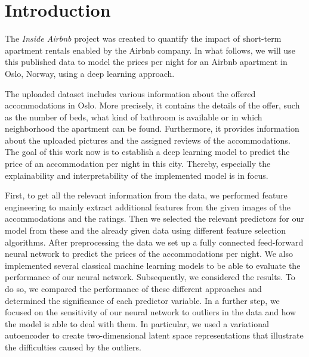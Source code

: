 \section{Introduction}


The \emph{Inside Airbnb} project was created to quantify the impact of short-term apartment rentals enabled by the Airbnb company.
In what follows, we will use this published data to model the prices per night for an Airbnb apartment in Oslo, Norway, using a deep learning approach. 

The uploaded dataset includes various information about the offered accommodations in Oslo. More precisely, it contains the details of the offer, such as the number of beds, what kind of bathroom is available or in which neighborhood the apartment can be found. Furthermore, it provides information about the uploaded pictures and the assigned reviews of the accommodations.
The goal of this work now is to establish a deep learning model to predict the price of an accommodation per night in this city. Thereby, especially the explainability and interpretability of the implemented model is in focus.

First, to get all the relevant information from the data, we performed feature engineering to mainly extract additional features from the given images of the accommodations and the ratings. Then we selected the relevant predictors for our model from these and the already given data using different feature selection algorithms. After preprocessing the data we set up a fully connected feed-forward neural network to predict the prices of the accommodations per night. We also implemented several classical machine learning models to be able to evaluate the performance of our neural network.
Subsequently, we considered the results. To do so, we compared the performance of these different approaches and determined the significance of each predictor variable. In a further step, we focused on the sensitivity of our neural network to outliers in the data and how the model is able to deal with them. In particular, we used a variational autoencoder to create two-dimensional latent space representations that illustrate the difficulties caused by the outliers.

